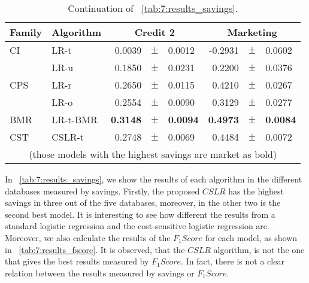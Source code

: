 \begin{table}
    \centering
    \footnotesize
    \begin{tabular}{l l r@{\hskip 0in}c@{\hskip 0in}l r@{\hskip 0in}c@{\hskip 0in}l  } %
    \hline
    \bf{Family} & \bf{Algorithm} &  \multicolumn{3}{c}{\bf{Credit 2}} 
& \multicolumn{3}{c}{\bf{Marketing}} \\ 
    \hline
CI&LR-t & 0.0039 &$\pm$& 0.0012 & -0.2931 &$\pm$& 0.0602\\ 
&LR-u & 0.1850 &$\pm$& 0.0231 & 0.2200 &$\pm$& 0.0376\\ 
\hline 
CPS&LR-r & 0.2650 &$\pm$& 0.0115 & 0.4210 &$\pm$& 0.0267\\ 
&LR-o & 0.2554 &$\pm$& 0.0090 & 0.3129 &$\pm$& 0.0277\\ 
\hline 
BMR&LR-t-BMR & \bf{0.3148} &\bf{$\pm$}& \bf{0.0094} & \bf{0.4973} &\bf{$\pm$}& \bf{0.0084}\\ 
\hline 
CST&CSLR-t & 0.2748 &$\pm$& 0.0069 & 0.4484 &$\pm$& 0.0072\\ 
\hline 
  \multicolumn{8}{c}{(those models with the highest savings are market as bold)}
  \end{tabular}
    \caption{Continuation of \tablename{~\ref{tab:7:results_savings}}.}
    \label{tab:7:results_savings2}
  \end{table}

In \tablename{~\ref{tab:7:results_savings}}, we show the results of each algorithm in the different 
databases measured by savings. Firstly, the proposed $CSLR$ has the highest savings in three out of 
the five databases, moreover, in the other two is the second best model. It is interesting to see 
how different the results from a standard logistic regression and the cost-sensitive logistic 
regression are. Moreover, we also calculate the results of the $F_1Score$ for each model, as 
shown in \tablename{~\ref{tab:7:results_fscore}}. It is observed, that the $CSLR$ algorithm, is not 
the one that gives the best results measured by $F_1Score$. In fact, there is not a clear relation 
between the results measured by savings or  $F_1Score$.

